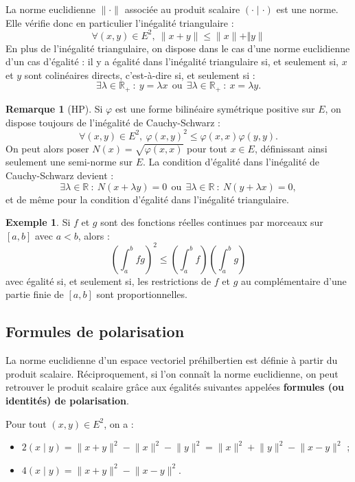 \documentclass[french]{article}
\newcommand{\R}{\mathbb{R}}
\theoremstyle{plain}
\theoremstyle{definition}
\newtheorem*{ex}{Exemple}
\newtheorem*{rmq}{Remarque}
\theoremstyle{remark}
\begin{document}
\begin{prop}
	La norme euclidienne $\lVert\cdot\rVert$ associée au produit scalaire $(\cdot\mid\cdot)$ est une norme. Elle vérifie donc en particulier l'inégalité triangulaire : $$\forall (x,y)\in E^2,\ \lVert x+y\rVert\leqslant\lVert x\rVert+\Vert y\rVert$$ En plus de l'inégalité triangulaire, on dispose dans le cas d'une norme euclidienne d'un cas d'égalité : il y a égalité dans l'inégalité triangulaire si, et seulement si, $x$ et $y$ sont colinéaires directs, c'est-à-dire si, et seulement si : $$\exists\lambda\in\R_+\ : \ y=\lambda x\ \ \text{ou}\ \ \exists\lambda\in\R_+\ : \ x=\lambda y.$$
\end{prop}

\begin{rmq}[HP]
	Si $\varphi$ est une forme bilinéaire symétrique positive sur $E$, on dispose toujours de l'inégalité de Cauchy-Schwarz : $$\forall (x,y)\in E^2,\ \varphi(x,y)^2\leqslant\varphi(x,x)\varphi(y,y).$$ On peut alors poser $N(x)=\sqrt{\varphi(x,x)}$ pour tout $x\in E$, définissant ainsi seulement une semi-norme sur $E$. La condition d'égalité dans l'inégalité de Cauchy-Schwarz devient : $$\exists\lambda\in\R\ : \ N(x+\lambda y)=0\ \ \text{ou}\ \ \exists\lambda\in\R\ : \ N(y+\lambda x)=0,$$ et de même pour la condition d'égalité dans l'inégalité triangulaire.
\end{rmq}

\begin{ex}
	Si $f$ et $g$ sont des fonctions réelles continues par morceaux sur $[a,b]$ avec $a<b$, alors : $$\left(\int_{a}^{b}fg\right)^2\leqslant\left(\int_{a}^{b}f\right)\left(\int_{a}^{b}g\right)$$ avec égalité si, et seulement si, les restrictions de $f$ et $g$ au complémentaire d'une partie finie de $[a,b]$ sont proportionnelles.
\end{ex}

\subsection{Formules de polarisation}

La norme euclidienne d'un espace vectoriel préhilbertien est définie à partir du produit scalaire. Réciproquement, si l'on connaît la norme euclidienne, on peut retrouver le produit scalaire grâce aux égalités suivantes appelées \textbf{formules (ou identités) de polarisation}.

\begin{prop}
	Pour tout $(x,y)\in E^2$, on a :
	\begin{itemize}
		\item $2(x\mid y)=\lVert x+y\rVert^2-\lVert x\rVert^2-\lVert y\rVert^2=\lVert x\rVert^2+\lVert y\rVert^2-\lVert x-y\rVert^2$ ;
		\item $4(x\mid y)=\lVert x+y\rVert^2-\lVert x-y\rVert^2$.
	\end{itemize}
\end{prop}
\end{document}
